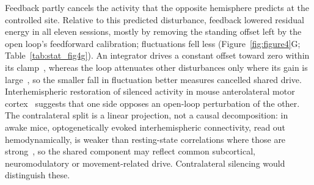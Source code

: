 Feedback partly cancels the activity that the opposite hemisphere predicts at the controlled site. Relative to this predicted disturbance, feedback lowered residual energy in all eleven sessions, mostly by removing the standing offset left by the open loop's feedforward calibration; fluctuations fell less (Figure~\ref{fig:figure4}G; Table~\ref{tab:stat_fig4g}). An integrator drives a constant offset toward zero within its clamp~\citep{francis1976internal}, whereas the loop attenuates other disturbances only where its gain is large~\citep{astrom2008feedback}, so the smaller fall in fluctuation better measures cancelled shared drive. Interhemispheric restoration of silenced activity in mouse anterolateral motor cortex~\citep{li2016robust} suggests that one side opposes an open-loop perturbation of the other. The contralateral split is a linear projection, not a causal decomposition: in awake mice, optogenetically evoked interhemispheric connectivity, read out hemodynamically, is weaker than resting-state correlations where those are strong~\citep{bauer2018effective}, so the shared component may reflect common subcortical, neuromodulatory or movement-related drive. Contralateral silencing would distinguish these.

